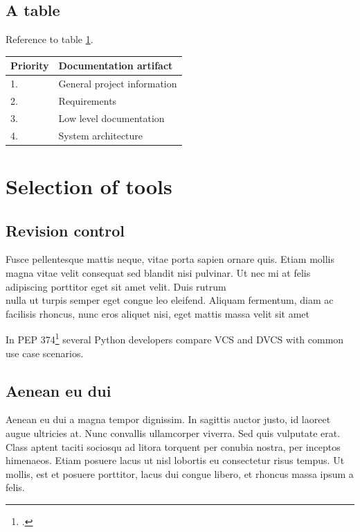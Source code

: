 \subsection{A table}
\label{sec:atable}


Reference to table \ref{tab:importance_artifacts}.\\


\begin{table}[H]
\begin{center}
  \begin{tabular}{p{2cm}|p{8cm}}
	Priority &	Documentation artifact\\\hline
	1. &	General project information \\
	2. &	Requirements \\
	3. &	Low level documentation\\
	4. &	System architecture\\
  \end{tabular}
	\label{tab:importance_artifacts}
\end{center}
\end{table}




\newpage
\section{Selection of tools}


\subsection{Revision control}

Fusce pellentesque mattis neque, vitae porta sapien ornare quis. Etiam mollis
magna vitae velit consequat sed blandit nisi pulvinar. Ut nec mi at felis
adipiscing porttitor eget sit amet velit. Duis rutrum\\
nulla ut turpis semper eget congue leo eleifend. Aliquam fermentum, diam ac
facilisis rhoncus, nunc eros aliquet nisi, eget mattis massa velit sit amet


In PEP 374\footcite{pep_374} several Python developers compare VCS and DVCS with
common use case scenarios.\\



\subsection{Aenean eu dui}
Aenean eu dui a magna tempor dignissim. In sagittis auctor justo, id laoreet
augue ultricies at. Nunc convallis ullamcorper viverra. Sed quis vulputate
erat. Class aptent taciti sociosqu ad litora torquent per conubia nostra, per
inceptos himenaeos. Etiam posuere lacus ut nisl lobortis eu consectetur risus
tempus. Ut mollis, est et posuere porttitor, lacus dui congue libero, et
rhoncus massa ipsum a felis. 

